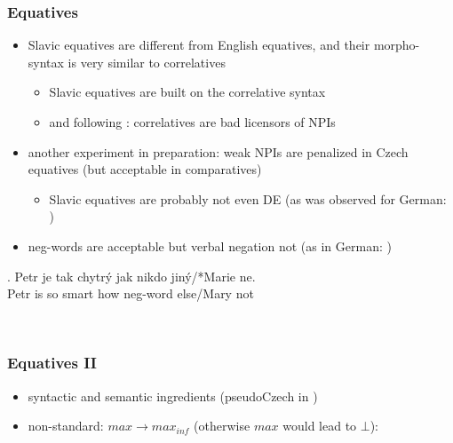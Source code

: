 \documentclass[
  letterpaper,
  DIV=11,
  numbers=noendperiod]{scrartcl}
\providecommand{\tightlist}{%
  \setlength{\itemsep}{0pt}\setlength{\parskip}{0pt}}\usepackage{longtable,booktabs,array}
\begin{document}
\hypertarget{equatives}{%
\subsubsection{Equatives}\label{equatives}}

\begin{itemize}
\tightlist
\item
  Slavic equatives are different from English equatives, and their
  morpho-syntax is very similar to correlatives

  \begin{itemize}
  \tightlist
  \item
    Slavic equatives are built on the correlative syntax
  \item
    and following \cite{pauline1995quantificational}: correlatives are
    bad licensors of NPIs
  \end{itemize}
\item
  another experiment in preparation: weak NPIs are penalized in Czech
  equatives (but acceptable in comparatives)

  \begin{itemize}
  \tightlist
  \item
    Slavic equatives are probably not even DE (as was observed for
    German: \cite{krifka1992some,penka2016degree})
  \end{itemize}
\item
  neg-words are acceptable but verbal negation not (as in German:
  \cite{penka2016degree})
\end{itemize}

\exg. Petr je tak chytrý jak nikdo jiný/*Marie ne.\\
Petr is so smart how neg-word else/Mary not\\
\hspace*{0.333em}

~

\hypertarget{equatives-ii}{%
\subsubsection{Equatives II}\label{equatives-ii}}

\begin{itemize}
\tightlist
\item
  syntactic and semantic ingredients (pseudoCzech in \Next)
\item
  non-standard: \(max \rightarrow max_{inf}\) (otherwise \(max\) would
  lead to \(\bot\)): \cite{penka2016degree}
\end{itemize}
\end{document}
